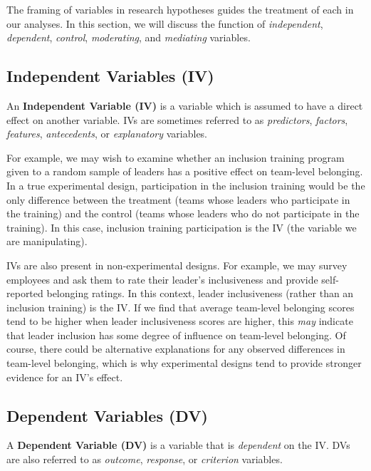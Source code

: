 \documentclass[]{book}
\begin{document}
The framing of variables in research hypotheses guides the treatment of each in our analyses. In this section, we will discuss the function of \emph{independent}, \emph{dependent}, \emph{control}, \emph{moderating}, and \emph{mediating} variables.

\hypertarget{independent-variables-iv}{%
\subsection{Independent Variables (IV)}\label{independent-variables-iv}}

An \textbf{Independent Variable (IV)} is a variable which is assumed to have a direct effect on another variable. IVs are sometimes referred to as \emph{predictors}, \emph{factors}, \emph{features}, \emph{antecedents}, or \emph{explanatory} variables.

For example, we may wish to examine whether an inclusion training program given to a random sample of leaders has a positive effect on team-level belonging. In a true experimental design, participation in the inclusion training would be the only difference between the treatment (teams whose leaders who participate in the training) and the control (teams whose leaders who do not participate in the training). In this case, inclusion training participation is the IV (the variable we are manipulating).

IVs are also present in non-experimental designs. For example, we may survey employees and ask them to rate their leader's inclusiveness and provide self-reported belonging ratings. In this context, leader inclusiveness (rather than an inclusion training) is the IV. If we find that average team-level belonging scores tend to be higher when leader inclusiveness scores are higher, this \emph{may} indicate that leader inclusion has some degree of influence on team-level belonging. Of course, there could be alternative explanations for any observed differences in team-level belonging, which is why experimental designs tend to provide stronger evidence for an IV's effect.

\hypertarget{dependent-variables-dv}{%
\subsection{Dependent Variables (DV)}\label{dependent-variables-dv}}

A \textbf{Dependent Variable (DV)} is a variable that is \emph{dependent} on the IV. DVs are also referred to as \emph{outcome}, \emph{response}, or \emph{criterion} variables.
\end{document}
